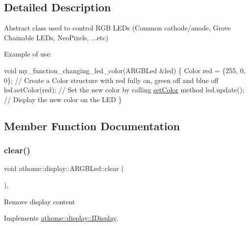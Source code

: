 \subsection{Detailed Description}
Abstract class used to control R\+GB L\+E\+Ds (Common cathode/anode, Grove Chainable L\+E\+Ds, Neo\+Pixels, ...etc)

Example of use\+:


\begin{DoxyCode}
\textcolor{keywordtype}{void} my\_function\_changing\_led\_color(ARGBLed &led) \{
  Color red = \{255, 0, 0\}; \textcolor{comment}{// Create a Color structure with red fully on,}
green off and blue off led.setColor(red); \textcolor{comment}{// Set the new color by calling}
\mbox{\hyperlink{classathome_1_1display_1_1_a_r_g_b_led_a7ca4858c1ee10cc2f7c1dcc11a6d050e}{setColor}} method led.update(); \textcolor{comment}{// Display the new color on the LED}
\}
\end{DoxyCode}
 

\subsection{Member Function Documentation}
\mbox{\label{classathome_1_1display_1_1_a_r_g_b_led_a9753e3a23ea5cb6b0a41079bc6128766}} 
\subsubsection{\texorpdfstring{clear()}{clear()}}
{\footnotesize\ttfamily void athome\+::display\+::\+A\+R\+G\+B\+Led\+::clear (\begin{DoxyParamCaption}{ }\end{DoxyParamCaption})\hspace{0.3cm}{\ttfamily [inline]}, {\ttfamily [virtual]}}

Remove display content 

Implements \mbox{\hyperlink{classathome_1_1display_1_1_i_display_a0d3add1ce61c96657827fb56d250d9c6}{athome\+::display\+::\+I\+Display}}.

\mbox{\label{classathome_1_1display_1_1_a_r_g_b_led_a2c3022a5aad43595fefc4b52d916467a}} 
